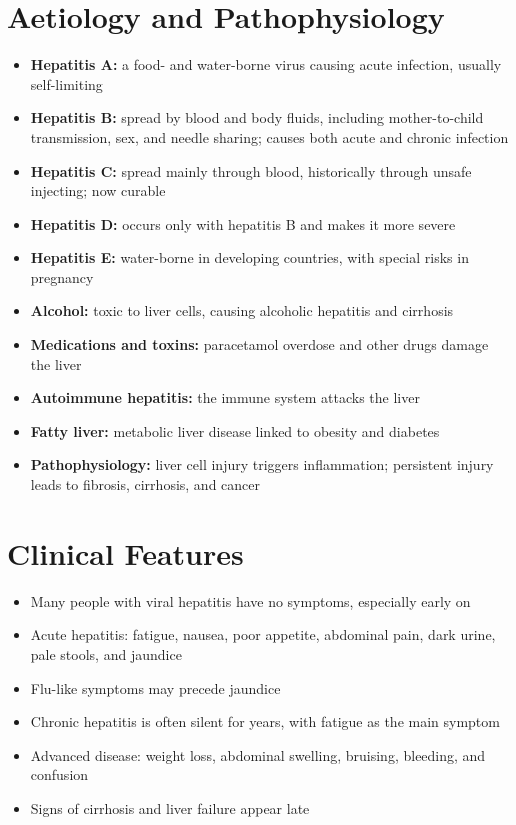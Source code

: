 \section*{Aetiology and Pathophysiology}
\begin{itemize}
    \item \textbf{Hepatitis A:} a food- and water-borne virus causing acute infection, usually self-limiting
    \item \textbf{Hepatitis B:} spread by blood and body fluids, including mother-to-child transmission, sex, and needle sharing; causes both acute and chronic infection
    \item \textbf{Hepatitis C:} spread mainly through blood, historically through unsafe injecting; now curable
    \item \textbf{Hepatitis D:} occurs only with hepatitis B and makes it more severe
    \item \textbf{Hepatitis E:} water-borne in developing countries, with special risks in pregnancy
    \item \textbf{Alcohol:} toxic to liver cells, causing alcoholic hepatitis and cirrhosis
    \item \textbf{Medications and toxins:} paracetamol overdose and other drugs damage the liver
    \item \textbf{Autoimmune hepatitis:} the immune system attacks the liver
    \item \textbf{Fatty liver:} metabolic liver disease linked to obesity and diabetes
    \item \textbf{Pathophysiology:} liver cell injury triggers inflammation; persistent injury leads to fibrosis, cirrhosis, and cancer
\end{itemize}

\section*{Clinical Features}
\begin{itemize}
    \item Many people with viral hepatitis have no symptoms, especially early on
    \item Acute hepatitis: fatigue, nausea, poor appetite, abdominal pain, dark urine, pale stools, and jaundice
    \item Flu-like symptoms may precede jaundice
    \item Chronic hepatitis is often silent for years, with fatigue as the main symptom
    \item Advanced disease: weight loss, abdominal swelling, bruising, bleeding, and confusion
    \item Signs of cirrhosis and liver failure appear late
\end{itemize}

